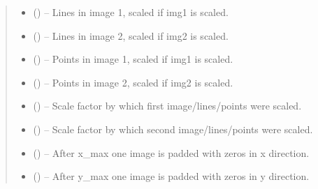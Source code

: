 \documentclass[letterpaper,10pt,english]{sphinxmanual}
\begin{document}
\begin{fulllineitems}
\begin{quote}
\begin{description}
\begin{itemize}
\item {} 
 () -- Lines in image 1, scaled if img1 is scaled.

\item {} 
 () -- Lines in image 2, scaled if img2 is scaled.

\item {} 
 () -- Points in image 1, scaled if img1 is scaled.

\item {} 
 () -- Points in image 2, scaled if img2 is scaled.

\item {} 
 () -- Scale factor by which first image/lines/points were
scaled.

\item {} 
 () -- Scale factor by which second image/lines/points were
scaled.

\item {} 
 () -- After x\_max one image is padded with zeros in x direction.

\item {} 
 () -- After y\_max one image is padded with zeros in y direction.

\end{itemize}


\end{description}\end{quote}

\end{fulllineitems}

\end{document}
